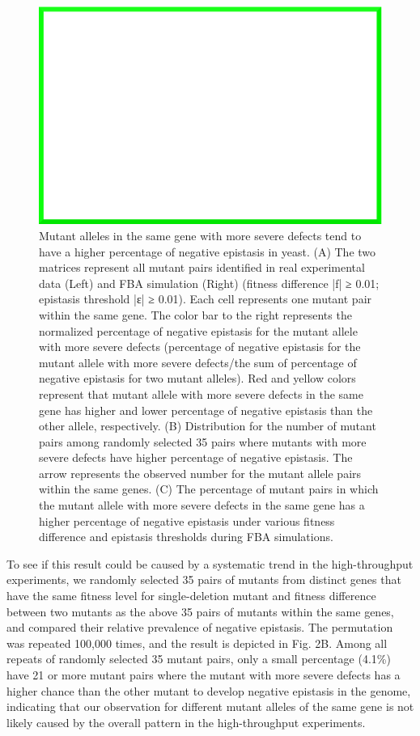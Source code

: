 \begin{figure}
\centering
\includegraphics[width=\textwidth]{dummy}
\caption{Mutant alleles in the same gene with more severe defects tend
to have a higher percentage of negative epistasis in yeast. (A) The
two matrices represent all mutant pairs identified in real
experimental data (Left) and FBA simulation (Right) (fitness
difference |f| ≥ 0.01; epistasis threshold |ε| ≥ 0.01). Each cell
represents one mutant pair within the same gene. The color bar to the
right represents the normalized percentage of negative epistasis for
the mutant allele with more severe defects (percentage of negative
epistasis for the mutant allele with more severe defects/the sum of
percentage of negative epistasis for two mutant alleles). Red and
yellow colors represent that mutant allele with more severe defects in
the same gene has higher and lower percentage of negative epistasis
than the other allele, respectively. (B) Distribution for the number
of mutant pairs among randomly selected 35 pairs where mutants with
more severe defects have higher percentage of negative epistasis. The
arrow represents the observed number for the mutant allele pairs
within the same genes. (C) The percentage of mutant pairs in which the
mutant allele with more severe defects in the same gene has a higher
percentage of negative epistasis under various fitness difference and
epistasis thresholds during FBA simulations.}
\label{fig:expVerifyYeast1}
\end{figure}

To see if this result could be caused by a systematic trend in the
high-throughput experiments, we randomly selected 35 pairs of mutants
from distinct genes that have the same fitness level for
single-deletion mutant and fitness difference between two mutants as
the above 35 pairs of mutants within the same genes, and compared
their relative prevalence of negative epistasis. The permutation was
repeated 100,000 times, and the result is depicted in Fig. 2B. Among
all repeats of randomly selected 35 mutant pairs, only a small
percentage (4.1\%) have 21 or more mutant pairs where the mutant with
more severe defects has a higher chance than the other mutant to
develop negative epistasis in the genome, indicating that our
observation for different mutant alleles of the same gene is not
likely caused by the overall pattern in the high-throughput
experiments.

